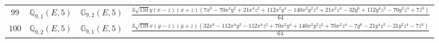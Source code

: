 \documentclass[fleqn,8pt,landscape]{jsarticle}
\begin{document}
\begin{table}[ht!]
\begin{center}
\begin{tabular}{cccl}
$ 99 $ & $ \mathbb{Q}_{9,1}(E,5) $ & $ \mathbb{G}_{9,2}(E,5) $ & $ \frac{3 \sqrt{110} y \left(x - z\right) \left(x + z\right) \left(7 x^{6} - 70 x^{4} y^{2} + 21 x^{4} z^{2} + 112 x^{2} y^{4} - 140 x^{2} y^{2} z^{2} + 21 x^{2} z^{4} - 32 y^{6} + 112 y^{4} z^{2} - 70 y^{2} z^{4} + 7 z^{6}\right)}{64} $ \\
$ 100 $ & $ \mathbb{Q}_{9,2}(E,5) $ & $ \mathbb{G}_{9,1}(E,5) $ & $ \frac{3 \sqrt{110} x \left(y - z\right) \left(y + z\right) \left(32 x^{6} - 112 x^{4} y^{2} - 112 x^{4} z^{2} + 70 x^{2} y^{4} + 140 x^{2} y^{2} z^{2} + 70 x^{2} z^{4} - 7 y^{6} - 21 y^{4} z^{2} - 21 y^{2} z^{4} - 7 z^{6}\right)}{64} $ \\
 \hline \hline
\end{tabular}
\end{center}
\end{table}
\end{document}

